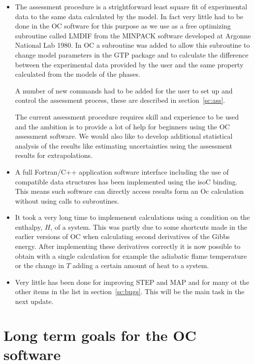 \documentclass[12pt]{article}
\begin{document}
\begin{itemize}
\item The assessment procedure is a strightforward least square fit of
  experimental data to the same data calculated by the model.  In fact
  very little had to be done in the OC software for this purpose as we
  use as a free optimizing subroutine called LMDIF from the MINPACK
  software developed at Argonne National Lab 1980.  In OC a subroutine
  was added to allow this subroutine to change model parameters in the
  GTP package and to calculate the difference between the experimental
  data provided by the user and the same property calculated from the
  models of the phases.

  A number of new commands had to be added for the user to set up and
  control the assessment process, these are described in
  section~\ref{sc:ass}.

  The current assessment procedure requires skill and experience to be
  used and the ambition is to provide a lot of help for beginners
  using the OC assessment software.  We would also like to develop
  additional statistical analysis of the results like estimating
  uncertainties using the assessment results for extrapolations.

\item A full Fortran/C++ application software interface including the
  use of compatible data structures has been implemented using the
  isoC binding.  This means such software can directly access results
  form an Oc calculation without using calls to subroutines.

\item It took a very long time to implemenent calculations using a
  condition on the enthalpy, $H$, of a system.  This was partly due to
  some shortcuts made in the earlier versions of OC when calculating
  second derivatives of the Gibbs energy.  After implementing these
  derivatives correctly it is now possible to obtain with a single
  calculation for example the adiabatic flame temperature or the
  change in $T$ adding a certain amount of heat to a system.

\item Very little has been done for improving STEP and MAP and for
  many ot the other items in the list in section~\ref{sc:bugs}.  This
  will be the main task in the next update.

\end{itemize}

\section{Long term goals for the OC software}
\end{document}
